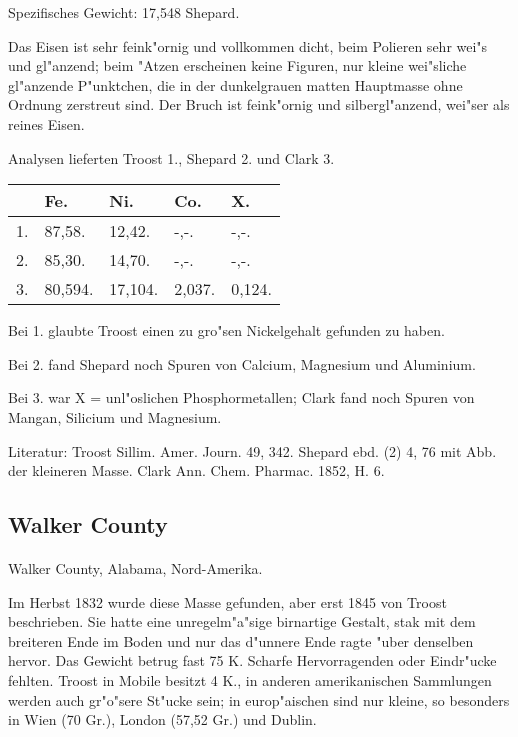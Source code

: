 \documentclass[a4paper, 11pt, oneside]{article}
\begin{document}
Spezifisches Gewicht: 17,548 Shepard.

Das Eisen ist sehr feink"ornig und vollkommen dicht, beim Polieren sehr wei"s und gl"anzend; beim "Atzen erscheinen keine Figuren, nur kleine wei"sliche gl"anzende P"unktchen, die in der dunkelgrauen matten Hauptmasse ohne Ordnung zerstreut sind. Der Bruch ist feink"ornig und silbergl"anzend, wei"ser als reines Eisen.

Analysen lieferten Troost 1., Shepard 2. und Clark 3.
\begin{table}[H]
    \centering
    \begin{tabular}{l l l l l}
         & Fe. & Ni. & Co. & X. \\ \hline
        1. & 87,58. & 12,42. & -,-. & -,-. \\
        2. & 85,30. & 14,70. & -,-. & -,-. \\
        3. & 80,594. & 17,104. & 2,037. & 0,124. \\
    \end{tabular}
\end{table}

Bei 1. glaubte Troost einen zu gro"sen Nickelgehalt gefunden zu haben.

Bei 2. fand Shepard noch Spuren von Calcium, Magnesium und Aluminium.

Bei 3. war X = unl"oslichen Phosphormetallen; Clark fand noch Spuren von Mangan, Silicium und Magnesium.

\footnotesize
Literatur: Troost Sillim. Amer. Journ. 49, 342. Shepard ebd. (2) 4, 76 mit Abb. der kleineren Masse. Clark Ann. Chem. Pharmac. 1852, H. 6.

\subsection{Walker County}
\normalsize
\paragraph{}
Walker County, Alabama, Nord-Amerika.

Im Herbst 1832 wurde diese Masse gefunden, aber erst 1845 von Troost beschrieben. Sie hatte eine unregelm"a"sige birnartige Gestalt, stak mit dem breiteren Ende im Boden und nur das d"unnere Ende ragte "uber denselben hervor. Das Gewicht betrug fast 75 K. Scharfe Hervorragenden oder Eindr"ucke fehlten. Troost in Mobile besitzt 4 K., in anderen amerikanischen Sammlungen werden auch gr"o"sere St"ucke sein; in europ"aischen sind nur kleine, so besonders in Wien (70 Gr.), London (57,52 Gr.) und Dublin.
\end{document}
